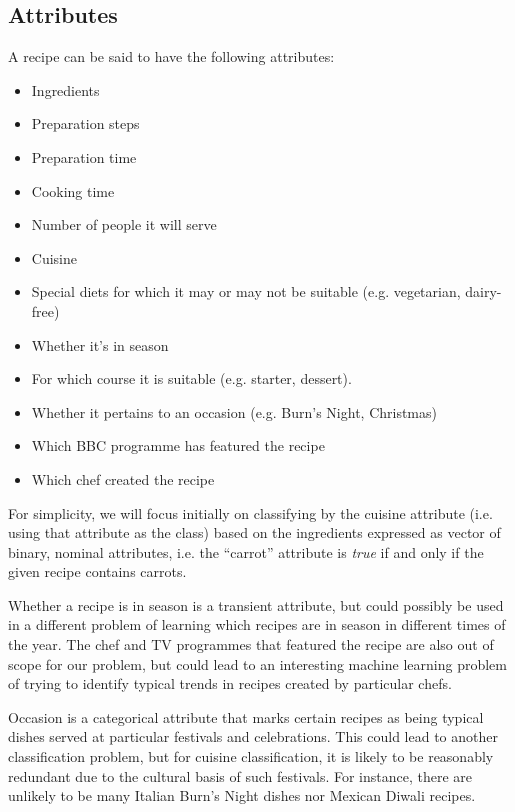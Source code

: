 \documentclass[11pt,a4paper]{article}
\begin{document}
\subsection{Attributes}

A recipe can be said to have the following attributes:

\begin{itemize}
\item Ingredients
\item Preparation steps
\item Preparation time
\item Cooking time
\item Number of people it will serve
\item Cuisine
\item Special diets for which it may or may not be suitable
  (e.g. vegetarian, dairy-free)
\item Whether it's in season
\item For which course it is suitable (e.g. starter, dessert).
\item Whether it pertains to an occasion (e.g. Burn's Night, Christmas)
\item Which BBC programme has featured the recipe
\item Which chef created the recipe
\end{itemize}

For simplicity, we will focus initially on classifying by the cuisine attribute
(i.e. using that attribute as the class) based on the ingredients expressed as
vector of binary, nominal attributes, i.e. the ``carrot'' attribute is
\emph{true} if and only if the given recipe contains carrots.

Whether a recipe is in season is a transient attribute, but could possibly be
used in a different problem of learning which recipes are in season in different
times of the year. The chef and TV programmes that featured the recipe are
also out of scope for our problem, but could lead to an interesting machine
learning problem of trying to identify typical trends in recipes created by
particular chefs.

Occasion is a categorical attribute that marks certain recipes as being typical
dishes served at particular festivals and celebrations. This could lead to
another classification problem, but for cuisine classification, it is likely to
be reasonably redundant due to the cultural basis of such festivals. For
instance, there are unlikely to be many Italian Burn's Night dishes nor Mexican
Diwali recipes.
\end{document}
